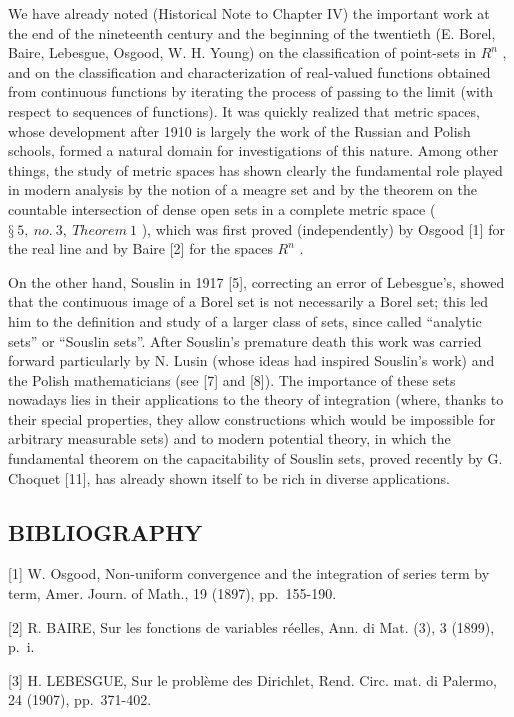 We have already noted (Historical Note to Chapter IV) the important work at the end of the nineteenth century and the beginning of the twentieth (E. Borel, Baire, Lebesgue, Osgood, W. H. Young) on the classification of point-sets in \(R^{n}\) , and on the classification and characterization of real-valued functions obtained from continuous functions by iterating the process of passing to the limit (with respect to sequences of functions). It was quickly realized that metric spaces, whose development after 1910 is largely the work of the Russian and Polish schools, formed a natural domain for investigations of this nature. Among other things, the study of metric spaces has shown clearly the fundamental role played in modern analysis by the notion of a meagre set and by the theorem on the countable intersection of dense open sets in a complete metric space ( \(§\ 5,\ no.\ 3,\ Theorem\ 1\) ), which was first proved (independently) by Osgood {[}1{]} for the real line and by Baire {[}2{]} for the spaces \(R^{n}\) .

On the other hand, Souslin in 1917 {[}5{]}, correcting an error of Lebesgue's, showed that the continuous image of a Borel set is not necessarily a Borel set; this led him to the definition and study of a larger class of sets, since called ``analytic sets'' or ``Souslin sets''. After Souslin's premature death this work was carried forward particularly by N. Lusin (whose ideas had inspired Souslin's work) and the Polish mathematicians (see {[}7{]} and {[}8{]}). The importance of these sets nowadays lies in their applications to the theory of integration (where, thanks to their special properties, they allow constructions which would be impossible for arbitrary measurable sets) and to modern potential theory, in which the fundamental theorem on the capacitability of Souslin sets, proved recently by G. Choquet {[}11{]}, has already shown itself to be rich in diverse applications.

\subsection*{BIBLIOGRAPHY}

{[}1{]} W. Osgood, Non-uniform convergence and the integration of series term by term, Amer. Journ. of Math., 19 (1897), pp.~155-190.

{[}2{]} R. BAIRE, Sur les fonctions de variables réelles, Ann. di Mat. (3), 3 (1899), p.~i.

{[}3{]} H. LEBESGUE, Sur le problème des Dirichlet, Rend. Circ. mat. di Palermo, 24 (1907), pp.~371-402.

